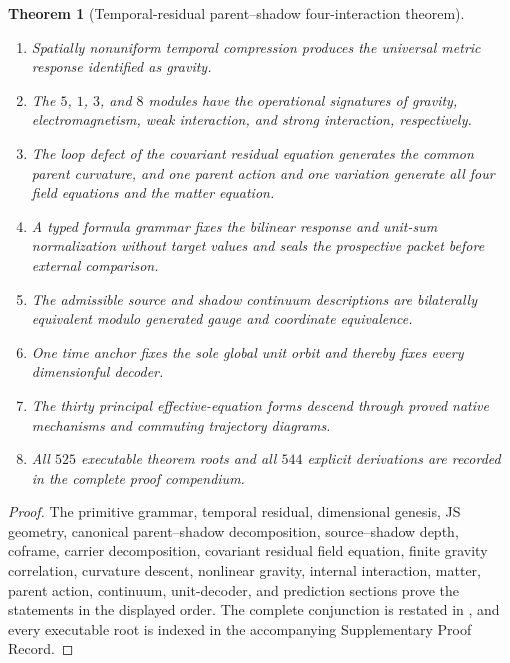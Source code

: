 \documentclass[11pt]{article}
\numberwithin{equation}{section}
\newtheorem{theorem}[definition]{Theorem}
\theoremstyle{remark}
\begin{document}
\begin{theorem}[Temporal-residual parent--shadow four-interaction theorem]
\begin{enumerate}
\item Spatially nonuniform temporal compression produces the universal metric response identified as gravity.
\item The $5$, $1$, $3$, and $8$ modules have the operational signatures of gravity, electromagnetism, weak interaction, and strong interaction, respectively.
\item The loop defect of the covariant residual equation generates the common parent curvature, and one parent action and one variation generate all four field equations and the matter equation.
\item A typed formula grammar fixes the bilinear response and unit-sum normalization without target values and seals the prospective packet before external comparison.
\item The admissible source and shadow continuum descriptions are bilaterally equivalent modulo generated gauge and coordinate equivalence.
\item One time anchor fixes the sole global unit orbit and thereby fixes every dimensionful decoder.
\item The thirty principal effective-equation forms descend through proved native mechanisms and commuting trajectory diagrams.
\item All $525$ executable theorem roots and all $544$ explicit derivations are recorded in the complete proof compendium.
\end{enumerate}
\end{theorem}

\begin{proof}
The primitive grammar, temporal residual, dimensional genesis, JS geometry, canonical parent--shadow decomposition, source--shadow depth, coframe, carrier decomposition, covariant residual field equation, finite gravity correlation, curvature descent, nonlinear gravity, internal interaction, matter, parent action, continuum, unit-decoder, and prediction sections prove the statements in the displayed order. The complete conjunction is restated in , and every executable root is indexed in the accompanying Supplementary Proof Record.
\end{proof}
\end{document}
